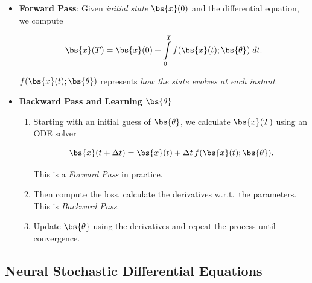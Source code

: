 \begin{itemize}

\item \textbf{Forward Pass}: Given \textit{initial state} $\bs{x}(0)$ and the differential equation, we compute

$$
\bs{x}(T) = \bs{x}(0) + \int \limits_0^T f(\bs{x}(t); \bs{\theta}) \; dt.
$$

$f(\bs{x}(t); \bs{\theta})$ represents \textit{how the state evolves at each instant}.

\item \textbf{Backward Pass and Learning $\bs{\theta}$}

\begin{enumerate}

\item Starting with an initial guess of $\bs{\theta}$, we calculate $\bs{x}(T)$ using an ODE solver

$$
\bs{x}(t+\Delta t)
=
\bs{x}(t)+\Delta t\, f(\bs{x}(t); \bs{\theta}).
$$

This is a \textit{Forward Pass} in practice.

\item Then compute the loss, calculate the derivatives w.r.t.\ the parameters. This is \textit{Backward Pass}.

\item Update $\bs{\theta}$ using the derivatives and repeat the process until convergence.

\end{enumerate}

\end{itemize}


\subsection{Neural Stochastic Differential Equations}

